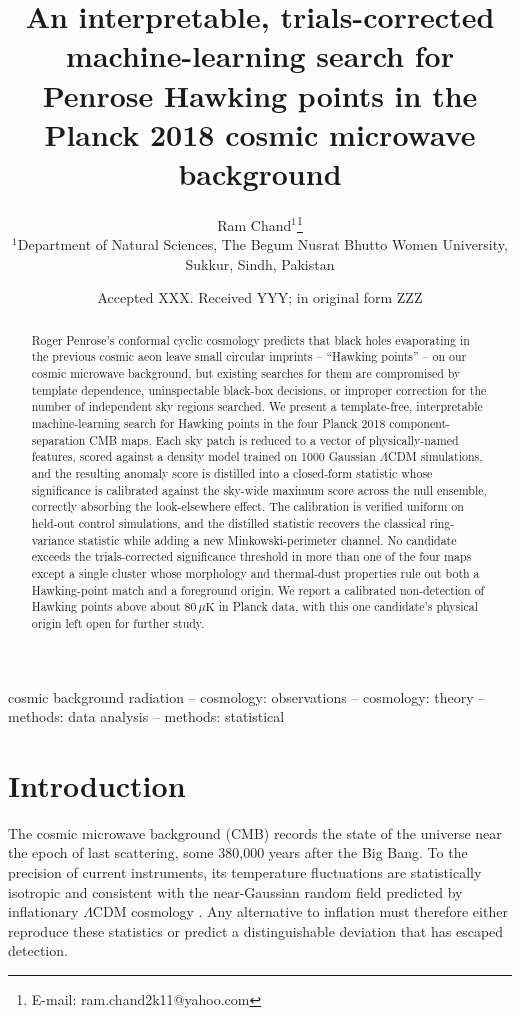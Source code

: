\documentclass[fleqn,usenatbib]{mnras}
\title[Interpretable ML search for Hawking points]{An interpretable, trials-corrected machine-learning search for Penrose Hawking points in the Planck 2018 cosmic microwave background}
\author[R. Chand]{
Ram Chand$^{1}$\thanks{E-mail: ram.chand2k11@yahoo.com}
\\
$^{1}$Department of Natural Sciences, The Begum Nusrat Bhutto Women University, Sukkur, Sindh, Pakistan
}
\date{Accepted XXX. Received YYY; in original form ZZZ}
\begin{document}
\label{firstpage}
\pagerange{\pageref{firstpage}--\pageref{lastpage}}
\maketitle

\begin{abstract}
Roger Penrose's conformal cyclic cosmology predicts that black holes evaporating in the previous cosmic aeon leave small circular imprints -- ``Hawking points'' -- on our cosmic microwave background, but existing searches for them are compromised by template dependence, uninspectable black-box decisions, or improper correction for the number of independent sky regions searched. We present a template-free, interpretable machine-learning search for Hawking points in the four Planck 2018 component-separation CMB maps. Each sky patch is reduced to a vector of physically-named features, scored against a density model trained on 1000 Gaussian $\Lambda$CDM simulations, and the resulting anomaly score is distilled into a closed-form statistic whose significance is calibrated against the sky-wide maximum score across the null ensemble, correctly absorbing the look-elsewhere effect. The calibration is verified uniform on held-out control simulations, and the distilled statistic recovers the classical ring-variance statistic while adding a new Minkowski-perimeter channel. No candidate exceeds the trials-corrected significance threshold in more than one of the four maps except a single cluster whose morphology and thermal-dust properties rule out both a Hawking-point match and a foreground origin. We report a calibrated non-detection of Hawking points above about $80\,\mu\mathrm{K}$ in Planck data, with this one candidate's physical origin left open for further study.
\end{abstract}

\begin{keywords}
cosmic background radiation -- cosmology: observations -- cosmology: theory -- methods: data analysis -- methods: statistical
\end{keywords}

\section{Introduction}\label{sec:intro}

The cosmic microwave background (CMB) records the state of the universe near the epoch of last scattering, some 380{,}000 years after the Big Bang. To the precision of current instruments, its temperature fluctuations are statistically isotropic and consistent with the near-Gaussian random field predicted by inflationary $\Lambda$CDM cosmology \citep{planck2018_i,planck2018_vi}. Any alternative to inflation must therefore either reproduce these statistics or predict a distinguishable deviation that has escaped detection.
\end{document}
